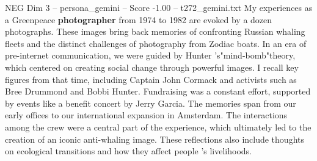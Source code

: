 \begin{textsample}{NEG Dim 3 – persona\_gemini – Score -1.00 – t272\_gemini.txt}  \label{ex:f3_neg_013}
My experiences as a Greenpeace \textbf{photographer} from 1974 to 1982 are evoked by a dozen photographs.
These images bring back memories of confronting Russian whaling fleets and the distinct challenges of photography from Zodiac boats.
In an era of pre-internet communication, we were guided by Hunter 's"mind-bomb"theory, which centered on creating social change through powerful images.
I recall key figures from that time, including Captain John Cormack and activists such as Bree Drummond and Bobbi Hunter.
Fundraising was a constant effort, supported by events like a benefit concert by Jerry Garcia.
The memories span from our early offices to our international expansion in Amsterdam.
The interactions among the crew were a central part of the experience, which ultimately led to the creation of an iconic anti-whaling image.
These reflections also include thoughts on ecological transitions and how they affect people 's livelihoods.

\end{textsample}
